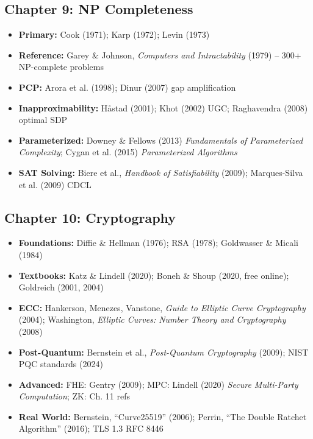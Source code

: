 \subsection{Chapter 9: NP Completeness}
\begin{itemize}
\item \textbf{Primary:} Cook (1971); Karp (1972); Levin (1973)
\item \textbf{Reference:} Garey \& Johnson, \emph{Computers and Intractability} (1979) -- 300+ NP-complete problems
\item \textbf{PCP:} Arora et al. (1998); Dinur (2007) gap amplification
\item \textbf{Inapproximability:} H{\aa}stad (2001); Khot (2002) UGC; Raghavendra (2008) optimal SDP
\item \textbf{Parameterized:} Downey \& Fellows (2013) \emph{Fundamentals of Parameterized Complexity}; Cygan et al. (2015) \emph{Parameterized Algorithms}
\item \textbf{SAT Solving:} Biere et al., \emph{Handbook of Satisfiability} (2009); Marques-Silva et al. (2009) CDCL
\end{itemize}

\subsection{Chapter 10: Cryptography}
\begin{itemize}
\item \textbf{Foundations:} Diffie \& Hellman (1976); RSA (1978); Goldwasser \& Micali (1984)
\item \textbf{Textbooks:} Katz \& Lindell (2020); Boneh \& Shoup (2020, free online); Goldreich (2001, 2004)
\item \textbf{ECC:} Hankerson, Menezes, Vanstone, \emph{Guide to Elliptic Curve Cryptography} (2004); Washington, \emph{Elliptic Curves: Number Theory and Cryptography} (2008)
\item \textbf{Post-Quantum:} Bernstein et al., \emph{Post-Quantum Cryptography} (2009); NIST PQC standards (2024)
\item \textbf{Advanced:} FHE: Gentry (2009); MPC: Lindell (2020) \emph{Secure Multi-Party Computation}; ZK: Ch. 11 refs
\item \textbf{Real World:} Bernstein, ``Curve25519'' (2006); Perrin, ``The Double Ratchet Algorithm'' (2016); TLS 1.3 RFC 8446
\end{itemize}

